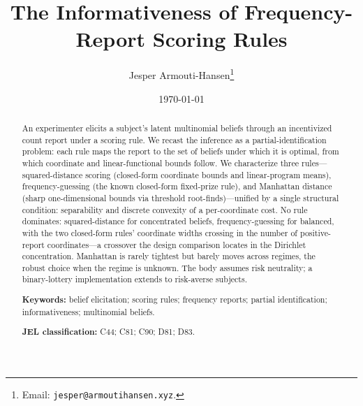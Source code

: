 \documentclass[11pt]{article}
\title{The Informativeness of Frequency-Report Scoring Rules}
\author{Jesper Armouti-Hansen\thanks{Email: \texttt{jesper@armoutihansen.xyz}.}}
\date{\today}
\newcommand{\1}{\mathbf{1}}
\theoremstyle{definition}
\theoremstyle{plain}
\begin{document}
\maketitle

\begin{abstract}
An experimenter elicits a subject's latent multinomial beliefs through an incentivized count report under a scoring rule.
We recast the inference as a partial-identification problem: each rule maps the report to the set of beliefs under which it is optimal, from which coordinate and linear-functional bounds follow.
We characterize three rules---squared-distance scoring (closed-form coordinate bounds and linear-program means), frequency-guessing (the known closed-form fixed-prize rule), and Manhattan distance (sharp one-dimensional bounds via threshold root-finds)---unified by a single structural condition: separability and discrete convexity of a per-coordinate cost.
No rule dominates: squared-distance for concentrated beliefs, frequency-guessing for balanced, with the two closed-form rules' coordinate widths crossing in the number of positive-report coordinates---a crossover the design comparison locates in the Dirichlet concentration.
Manhattan is rarely tightest but barely moves across regimes, the robust choice when the regime is unknown.
The body assumes risk neutrality; a binary-lottery implementation extends to risk-averse subjects.

\medskip
\noindent\textbf{Keywords:} belief elicitation; scoring rules; frequency reports; partial identification; informativeness; multinomial beliefs.

\smallskip
\noindent\textbf{JEL classification:} C44; C81; C90; D81; D83.
\end{abstract}
\newpage






\newpage



\newpage

\end{document}
